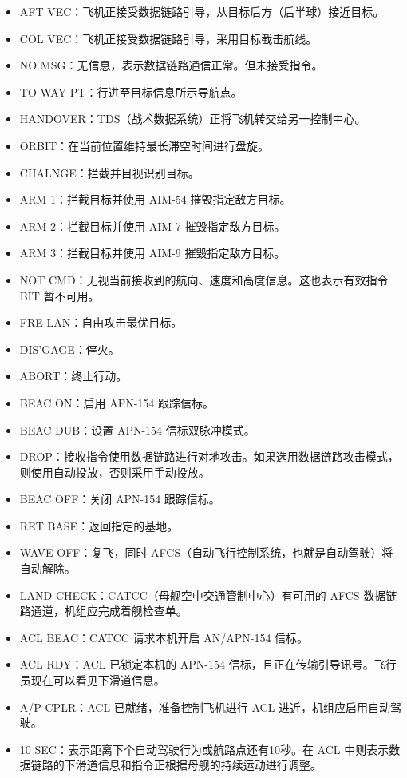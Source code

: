 \begin{itemize}
  \item AFT VEC：飞机正接受数据链路引导，从目标后方（后半球）接近目标。
  \item COL VEC：飞机正接受数据链路引导，采用目标截击航线。
  \item NO MSG：无信息，表示数据链路通信正常。但未接受指令。
  \item TO WAY PT：行进至目标信息所示导航点。
  \item HANDOVER：TDS（战术数据系统）正将飞机转交给另一控制中心。
  \item ORBIT：在当前位置维持最长滞空时间进行盘旋。
  \item CHALNGE：拦截并目视识别目标。
  \item ARM 1：拦截目标并使用 AIM-54 摧毁指定敌方目标。
  \item ARM 2：拦截目标并使用 AIM-7 摧毁指定敌方目标。
  \item ARM 3：拦截目标并使用 AIM-9 摧毁指定敌方目标。
  \item NOT CMD：无视当前接收到的航向、速度和高度信息。这也表示有效指令 BIT 暂不可用。
  \item FRE LAN：自由攻击最优目标。
  \item DIS’GAGE：停火。
  \item ABORT：终止行动。
  \item BEAC ON：启用 APN-154 跟踪信标。
  \item BEAC DUB：设置 APN-154 信标双脉冲模式。
  \item DROP：接收指令使用数据链路进行对地攻击。如果选用数据链路攻击模式，则使用自动投放，否则采用手动投放。
  \item BEAC OFF：关闭 APN-154 跟踪信标。
  \item RET BASE：返回指定的基地。
  \item WAVE OFF：复飞，同时 AFCS（自动飞行控制系统，也就是自动驾驶）将自动解除。
  \item LAND CHECK：CATCC（母舰空中交通管制中心）有可用的 AFCS 数据链路通道，机组应完成着舰检查单。
  \item ACL BEAC：CATCC 请求本机开启 AN/APN-154 信标。
  \item ACL RDY：ACL 已锁定本机的 APN-154 信标，且正在传输引导讯号。飞行员现在可以看见下滑道信息。
  \item A/P CPLR：ACL 已就绪，准备控制飞机进行 ACL 进近，机组应启用自动驾驶。
  \item 10 SEC：表示距离下个自动驾驶行为或航路点还有10秒。在 ACL 中则表示数据链路的下滑道信息和指令正根据母舰的持续运动进行调整。

\end{itemize}
